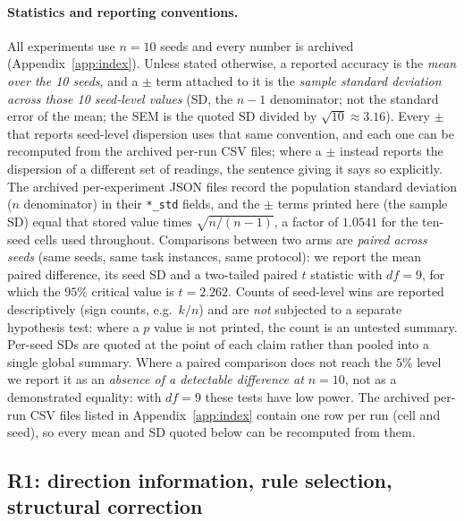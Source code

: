 \documentclass[preprint,12pt]{elsarticle}
\begin{document}
\paragraph{Statistics and reporting conventions.} All experiments use
$n=10$ seeds and every number is archived (Appendix~\ref{app:index}).
Unless stated otherwise, a reported accuracy is the \emph{mean over the 10
seeds}, and a $\pm$ term attached to it is the \emph{sample standard
deviation across those 10 seed-level values} (SD, the $n-1$ denominator;
not the standard error of the mean; the SEM is the quoted SD divided by
$\sqrt{10}\approx3.16$). Every $\pm$ that reports seed-level dispersion uses that same convention, and each one can be recomputed from the archived per-run CSV files;
where a $\pm$ instead reports the dispersion of a different set of readings, the sentence giving it says so explicitly. The archived
per-experiment JSON files record the population standard deviation ($n$
denominator) in their \texttt{*\_std} fields, and the $\pm$ terms printed here
(the sample SD) equal that stored value times $\sqrt{n/(n-1)}$, a factor of
$1.0541$ for the ten-seed cells used throughout. Comparisons between two
arms are \emph{paired across seeds} (same seeds, same task instances, same
protocol): we report the mean paired difference, its seed SD and a
two-tailed paired $t$ statistic with $df=9$, for which the $95\%$ critical
value is $t=2.262$. Counts of seed-level wins are reported descriptively
(sign counts, e.g.\ $k/n$) and are \emph{not} subjected to a separate
hypothesis test: where a $p$ value is not printed, the count is an
untested summary. Per-seed SDs are quoted at the point of each claim
rather than pooled into a single global summary. Where a paired comparison
does not reach the $5\%$ level we report it as an \emph{absence of a
detectable difference at $n=10$}, not as a demonstrated equality: with
$df=9$ these tests have low power. The archived per-run CSV files listed in
Appendix~\ref{app:index} contain one row per run (cell and seed), so every
mean and SD quoted below can be recomputed from them.

\subsection{R1: direction information, rule selection, structural
correction}
\label{sec:r1}
\end{document}
